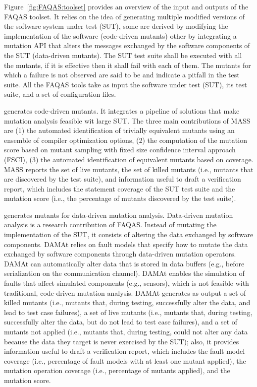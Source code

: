 Figure~\ref{fig:FAQAS:toolset} provides an overview of the input and outputs of the FAQAS toolset. It relies on the idea of generating multiple modified versions of the software system under test (SUT), some are derived by modifying the implementation of the software (code-driven mutants) other by integrating a mutation API that alters the messages exchanged by the software components of the SUT (data-driven mutants). 
The SUT test suite shall be executed with all the mutants, if it is effective then it shall fail with each of them. The mutants for which a failure is not observed are said to be  and indicate a pitfall in the test suite.
All the FAQAS tools take as input the software under test (SUT), its test suite, and a set of configuration files. 

 generates code-driven mutants. It integrates a pipeline of solutions that make mutation analysis feasible wit large SUT. The three main contributions of MASS are (1) the automated identification of trivially equivalent mutants using an ensemble of compiler optimization options, (2) the computation of the mutation score based on mutant sampling with fixed size confidence interval approach (FSCI), (3) the automated identification of equivalent mutants based on coverage. 
MASS reports the set of live mutants, the set of killed mutants (i.e., mutants that are discovered by the test suite), and information useful to draft a verification report, which includes the statement coverage of the SUT test suite and the mutation score (i.e., the percentage of mutants discovered by the test suite).

 generates mutants for data-driven mutation analysis. Data-driven mutation analysis is a research contribution of FAQAS. Instead of mutating the implementation of the SUT, it consists of altering the data exchanged by software components. 
DAMAt relies on fault models that specify how to mutate the data exchanged by software components through data-driven mutation operators. DAMAt can automatically alter data that is stored in data buffers (e.g., before serialization on the communication channel).
DAMAt enables the simulation of faults that affect simulated components (e.g., sensors), which is not feasible with traditional, code-driven mutation analysis. 
DAMAt generates as output a set of killed mutants (i.e., mutants that, during testing, successfully alter the data, and lead to test case failures), a set of live mutants (i.e., mutants that, during testing, successfully alter the data, but do not lead to test case failures), and a set of mutants not applied (i.e., mutants that, during testing, could not alter any data because the data they target is never exercised by the SUT); also, it provides information useful to draft a verification report, which includes the fault model coverage (i.e., percentage of fault models with at least one mutant applied), the mutation operation coverage (i.e., percentage of mutants applied), and the mutation score.

